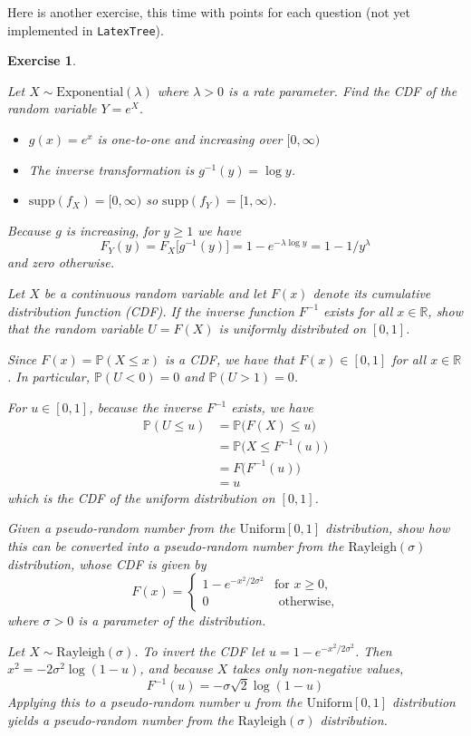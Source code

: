 \documentclass[12pt]{exam}
\newcommand{\R}{\mathbb{R}}
\newcommand{\prob}{\mathbb{P}}
\newcommand{\supp}{\text{supp}}
\def\it{\item}
\def\bit{\begin{itemize}}
\def\eit{\end{itemize}}
\theoremstyle{break}
\newtheorem{exercise}{Exercise}
\begin{document}
Here is another exercise, this time with points for each question (not yet implemented in {\tt LatexTree}).
\begin{exercise}
\begin{questions}

\question[7]
Let $X\sim\text{Exponential}(\lambda)$ where $\lambda>0$ is a rate parameter. Find the CDF of the random variable $Y=e^X$.
\droppoints
\begin{solution}
\bit
\it $g(x)=e^x$ is one-to-one and increasing over $[0,\infty)$
\it The inverse transformation is $g^{-1}(y) = \log y$.
\it $\supp(f_X)=[0,\infty)$ so $\supp(f_Y)=[1,\infty)$.
\eit
Because $g$ is increasing, for $y\geq 1$ we have
\[
F_Y(y) = F_X\big[g^{-1}(y)\big] = 1 - e^{-\lambda\log y} = 1 - 1/y^{\lambda}
\]
and zero otherwise.
\end{solution}

\question[4]
Let $X$ be a continuous random variable and let $F(x)$ denote its cumulative distribution function (CDF). If the inverse function $F^{-1}$ exists for all $x\in\R$, show that the random variable $U=F(X)$ is uniformly distributed on $[0,1]$.
\droppoints
\begin{solution}
Since $F(x)=\prob(X\leq x)$ is a CDF, we have that $F(x)\in [0,1]$ for all $x\in\R$.
In particular, $\prob(U<0)=0$ and $\prob(U>1)=0$.
\par
For $u\in[0,1]$, because the inverse $F^{-1}$ exists, we have 
\begin{align*}
\prob(U\leq u) 
	& = \prob\big(F(X)\leq u\big) \\
	& = \prob\big(X\leq F^{-1}(u)\big) \\
	& = F\big(F^{-1}(u)\big) \\
	& = u
\end{align*}
which is the CDF of the uniform distribution on $[0,1]$.
\end{solution}

\question[4]
Given a pseudo-random number from the $\text{Uniform}[0,1]$ distribution, show how this can be converted into a pseudo-random number from the $\text{Rayleigh}(\sigma)$ distribution, whose CDF is given by
\[
F(x) = \begin{cases}
	1 - e^{-x^2/2\sigma^2}	&\text{for $x\geq 0$,} \\
	0						& \text{ otherwise,}
	\end{cases}
\]
where $\sigma>0$ is a parameter of the distribution.
\droppoints
\begin{solution}
Let $X\sim\text{Rayleigh}(\sigma)$. To invert the CDF let $u=1-e^{-x^2/2\sigma^2}$. Then $x^2 = -2\sigma^2\log(1-u)$, and because $X$ takes only non-negative values,
\[
F^{-1}(u) = -\sigma\sqrt{2}\log(1-u)
\]
Applying this to a pseudo-random number $u$ from the $\text{Uniform}[0,1]$ distribution yields a pseudo-random number from the $\text{Rayleigh}(\sigma)$ distribution.
\end{solution}

\end{questions}
\end{exercise}
\end{document}
